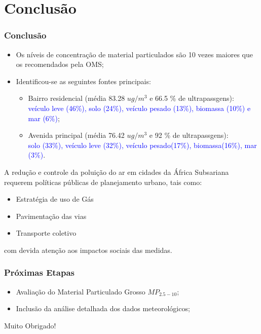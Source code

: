 \section{Conclusão}

\begin{frame}
  \frametitle{Conclusão}
  \begin{itemize}
    \item Os níveis de concentração de material particulados são 10 vezes maiores que os recomendados pela OMS;
    \item Identificou-se as seguintes fontes principais:
         \begin{itemize}
           \item Bairro residencial (média 83.28 $ug/m^3$ e 66.5 \% de ultrapassgens): \\
                 \textcolor{blue}{veículo leve (46\%), solo (24\%), veículo pesado (13\%), biomassa (10\%) e mar (6\%)};
           \item Avenida principal (média 76.42 $ug/m^3$ e 92 \% de ultrapassgens): \\
                 \textcolor{blue}{solo (33\%), veículo leve (32\%), veículo pesado(17\%), biomassa(16\%), mar (3\%)}.
         \end{itemize}
  \end{itemize}
\end{frame}


\begin{frame}
  A redução e controle da poluição do ar em cidades da África Subsariana requerem políticas públicas de planejamento urbano, tais como:
  \begin{itemize}
    \item Estratégia de uso de Gás
    \item Pavimentação das vias
    \item Transporte coletivo
  \end{itemize}
com devida atenção aos impactos sociais das medidas.
\end{frame}

\begin{frame}
  \frametitle{Próximas Etapas}
  \begin{itemize}
    \item Avaliação do Material Particulado Grosso $MP_{2.5-10}$;
    \item Inclusão da análise detalhada dos dados meteorológicos;
  \end{itemize}
\end{frame}

\begin{frame}
  \begin{center}
    Muito Obrigado!
  \end{center}
\end{frame}
